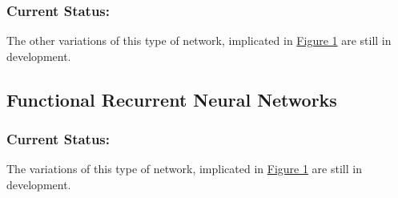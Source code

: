 \documentclass{article}
\begin{document}
\subsubsection{Current Status:}

\noindent The other variations of this type of network, implicated in \hyperref[fig:family]{Figure 1} are still in development.







\subsection{Functional Recurrent Neural Networks}

\subsubsection{Current Status:}

\noindent The variations of this type of network, implicated in \hyperref[fig:family]{Figure 1} are still in development.
\end{document}
